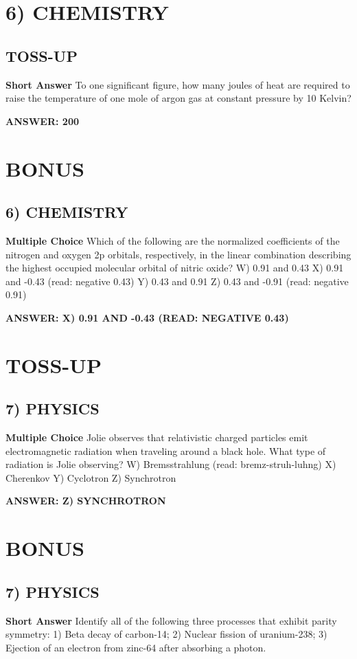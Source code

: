 \documentclass{article}
\begin{document}
\section*{6) CHEMISTRY}
\subsection*{TOSS-UP}
\textbf{Short Answer} To one significant figure, how many joules of heat are required to raise the temperature of one mole of argon gas at constant pressure by 10 Kelvin?

\textbf{ANSWER: 200}

\section*{BONUS}
\subsection*{6) CHEMISTRY}
\textbf{Multiple Choice} Which of the following are the normalized coefficients of the nitrogen and oxygen 2p orbitals, respectively, in the linear combination describing the highest occupied molecular orbital of nitric oxide?
W) 0.91 and 0.43
X) 0.91 and -0.43 (read: negative 0.43)
Y) 0.43 and 0.91
Z) 0.43 and -0.91 (read: negative 0.91)

\textbf{ANSWER: X) 0.91 AND -0.43 (READ: NEGATIVE 0.43)}

\section*{TOSS-UP}
\subsection*{7) PHYSICS}
\textbf{Multiple Choice} Jolie observes that relativistic charged particles emit electromagnetic radiation when traveling around a black hole.
What type of radiation is Jolie observing?
W) Bremsstrahlung (read: bremz-struh-luhng)
X) Cherenkov
Y) Cyclotron
Z) Synchrotron

\textbf{ANSWER: Z) SYNCHROTRON}

\section*{BONUS}
\subsection*{7) PHYSICS}
\textbf{Short Answer} Identify all of the following three processes that exhibit parity symmetry: 1) Beta decay of carbon-14; 2) Nuclear fission of uranium-238; 3) Ejection of an electron from zinc-64 after absorbing a photon.
\end{document}
